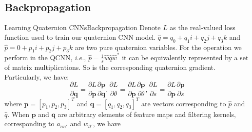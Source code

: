\documentclass{beamer}
\begin{document}
\subsection{Backpropagation}
\begin{frame}{Learning Quaternion CNNs}{Backpropagation}
Denote $L$ as the real-valued loss function used to train our quaternion CNN model. $\hat{q}=q_0+q_1i+q_2j+q_3k$ and $\hat{p}= 0 + p_1i + p_2j + p_3k$ are two pure quaternion variables. For the operation we perform in the QCNN, \emph{i.e.}, $\hat{p}=\frac{1}{s}\hat{w}\hat{q}\hat{w}^*$ it can be equivalently represented by a set of matrix multiplications. So is the corresponding quaternion gradient. Particularly, we have:
\begin{equation}
    \frac{\partial L}{\partial \textbf{q}}=\frac{\partial L}{\partial \textbf{p}}\frac{\partial \textbf{p}}{\partial \textbf{q}}, \frac{\partial L}{\partial \theta}=\frac{\partial L}{\partial \textbf{p}}\frac{\partial \textbf{p}}{\partial \theta}, \frac{\partial L}{\partial s}=\frac{\partial L}{\partial \textbf{p}}\frac{\partial \textbf{p}}{\partial s}
\end{equation}
where $\mathbf{p}=[p_1,p_2,p_3]^T$ and $\mathbf{q}=[q_1,q_2,q_3]^T$ are vectors corresponding to $\hat{p}$ and $\hat{q}$. When $\mathbf{p}$  and $\mathbf{q}$  are arbitrary elements of feature maps and filtering kernels,
corresponding to $a_{nn'}$ and $w_{ll'}$, we have

\end{frame}
\end{document}
